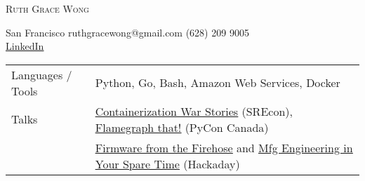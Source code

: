 \documentclass[letterpaper, oneside, final]{scrartcl} %
\begin{document}
\setlength{\pdfpagewidth}{8.5in}
\setlength{\pdfpageheight}{11in}

\begin{center} %


{\fontsize{36}{36}\spaceskip=12pt\selectfont\scshape Ruth Grace Wong} %

\vspace{1cm} %

{\renewcommand{\headfont}{\normalfont\rmfamily\scshape} %
\fontsize{12.5}{17}\selectfont\scshape %

San Francisco  {\large\textperiodcentered} ruthgracewong@gmail.com {\large\textperiodcentered} (628) 209 9005\\ %
\underline{\href{https://www.linkedin.com/in/ruthgracewong/}{LinkedIn}}
}

\vspace{0.2cm}

\begin{flushleft}
\begin{tabular}{ll}
     Languages / Tools & Python, Go, Bash, Amazon Web Services, Docker\\
     Talks & \underline{\href{https://www.usenix.org/conference/srecon18americas/presentation/wong}{Containerization War Stories}} (SREcon), \underline{\href{https://2017.pycon.ca/en/schedule/60/}{Flamegraph that!}} (PyCon Canada)\\
    & \underline{\href{https://hackaday.com/2019/02/22/supercon-ruth-grace-wong-and-firmware-from-the-firehose/}{Firmware from the Firehose}} and \underline{\href{https://hackaday.com/2020/01/03/you-could-be-a-manufacturing-engineer-if-you-could-only-find-the-time/}{Mfg Engineering in Your Spare Time}} (Hackaday) \\
\end{tabular}
\end{flushleft}


\end{center}
\end{document}
